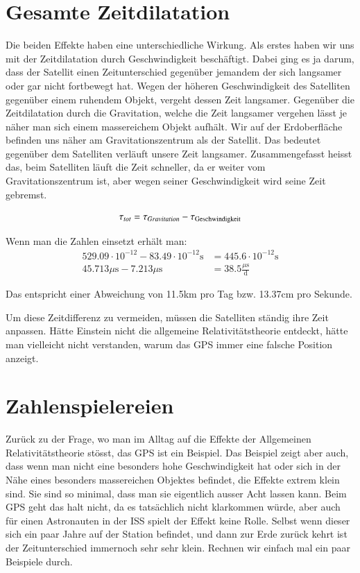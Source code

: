 \begin{refsection}
\section{Gesamte Zeitdilatation}
Die beiden Effekte haben eine unterschiedliche Wirkung. Als erstes haben wir uns mit der Zeitdilatation durch Geschwindigkeit beschäftigt. Dabei ging es ja darum, dass der Satellit einen Zeitunterschied gegenüber jemandem der sich langsamer oder gar nicht fortbewegt hat. Wegen der höheren Geschwindigkeit des Satelliten gegenüber einem ruhendem Objekt, vergeht dessen Zeit langsamer. Gegenüber die Zeitdilatation durch die Gravitation, welche die Zeit langsamer vergehen lässt je näher man sich einem massereichem Objekt aufhält. Wir auf der Erdoberfläche befinden uns näher am Gravitationszentrum als der Satellit. Das bedeutet gegenüber dem Satelliten verläuft unsere Zeit langsamer. Zusammengefasst heisst das, beim Satelliten läuft die Zeit schneller, da er weiter vom Gravitationszentrum ist, aber wegen seiner Geschwindigkeit wird seine Zeit gebremst.

\begin{equation}
\tau_{tot} = \tau_{Gravitation} - \tau_{\text{Geschwindigkeit}}\\
\end{equation}

\noindent{}Wenn man die Zahlen einsetzt erhält man:
\begin{align*}
529.09 \cdot 10^{-12} - 83.49 \cdot 10^{-12}\text{s} &= 445.6 \cdot 10^{-12}\text{s}
\\
45.713\mu{}\text{s} - 7.213\mu{}\text{s} &= 38.5\frac{\mu{}\text{s}}{\text{d}}
\end{align*}

\noindent{}Das entspricht einer Abweichung von 11.5km pro Tag bzw. 13.37cm pro Sekunde. 

Um diese Zeitdifferenz zu vermeiden, müssen die Satelliten ständig ihre Zeit anpassen. Hätte Einstein nicht die allgemeine Relativitätstheorie entdeckt, hätte man vielleicht nicht verstanden, warum das GPS immer eine falsche Position anzeigt. 

\section{Zahlenspielereien}
Zurück zu der Frage, wo man im Alltag auf die Effekte der Allgemeinen Relativitätstheorie stösst, das GPS ist ein Beispiel. Das Beispiel zeigt aber auch, dass wenn man nicht eine besonders hohe Geschwindigkeit hat oder sich in der Nähe eines besonders massereichen Objektes befindet, die Effekte extrem klein sind. Sie sind so minimal, dass man sie eigentlich ausser Acht lassen kann. Beim GPS geht das halt nicht, da es tatsächlich nicht klarkommen würde, aber auch für einen Astronauten in der ISS spielt der Effekt keine Rolle. Selbst wenn dieser sich ein paar Jahre auf der Station befindet, und dann zur Erde zurück kehrt ist der Zeitunterschied immernoch sehr sehr klein. Rechnen wir einfach mal ein paar Beispiele durch.


\end{refsection}

